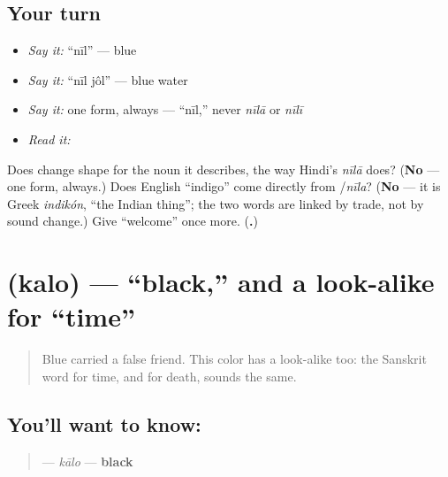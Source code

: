 \subsection*{Your turn}
\begin{itemize}
\raggedright
  \item \emph{Say it:} \textquotedblleft{}nīl\textquotedblright{} — blue
  \item \emph{Say it:} \textquotedblleft{}nīl jôl\textquotedblright{} — blue water
  \item \emph{Say it:} one form, always — \textquotedblleft{}nīl,\textquotedblright{} never \emph{nīlā} or \emph{nīlī}
  \item \emph{Read it:} \textbf{}
\end{itemize}

\begin{tcolorbox}[breakable,colback=teal!4,colframe=teal!35!black,title={Before you move on}]
Does  change shape for the noun it describes, the way Hindi's \emph{nīlā} does? (\textbf{No} — one form, always.) Does English \textquotedblleft{}indigo\textquotedblright{} come directly from /\emph{nīla}? (\textbf{No} — it is Greek \emph{indikón}, \textquotedblleft{}the Indian thing\textquotedblright{}; the two words are linked by trade, not by sound change.) Give \textquotedblleft{}welcome\textquotedblright{} once more. (\textbf{.})
\end{tcolorbox}
\section[\texorpdfstring{\bn{কালো} (kalo)}{কালো (kalo)}]{ (kalo) — \textquotedblleft{}black,\textquotedblright{} and a look-alike for \textquotedblleft{}time\textquotedblright{}}

\label{lesson:BN-C14-kalo}



\begin{quote}
Blue carried a false friend. This color has a look-alike too: the Sanskrit word for time, and for death, sounds the same.
\end{quote}

\subsection*{You'll want to know: }
\begin{quote}
\textbf{} — \emph{kālo} — \textbf{black}
\end{quote}

